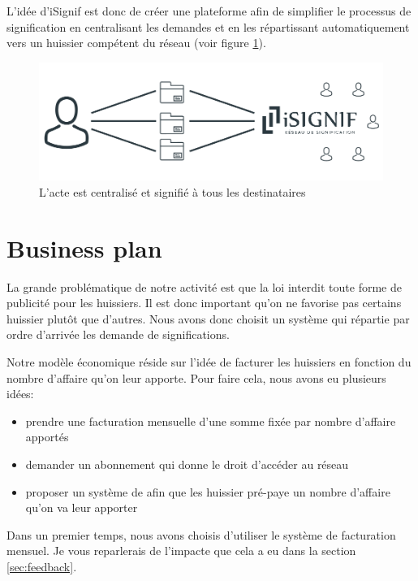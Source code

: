\documentclass[]{report}
\begin{document}
    L'idée d'iSignif est donc de créer une plateforme afin de simplifier le processus de signification en centralisant les demandes et en les répartissant automatiquement vers un huissier compétent du réseau  (voir figure \ref{fig:signification_after}).

    \begin{figure}
      \includegraphics[width=\linewidth]{img/signification_after.png}
      \caption{L'acte est centralisé et signifié à tous les destinataires}
      \label{fig:signification_after}
    \end{figure}

  \section{Business plan}

    La grande problématique de notre activité est que la loi interdit toute forme de publicité pour les huissiers. Il est donc important qu'on ne favorise pas certains huissier plutôt que d'autres. Nous avons donc choisit un système qui répartie par ordre d'arrivée les demande de significations.

    Notre modèle économique réside sur l'idée de facturer les huissiers en fonction du nombre d'affaire qu'on leur apporte. Pour faire cela, nous avons eu plusieurs idées:

    \begin{itemize}
      \item prendre une facturation mensuelle d'une somme fixée par nombre d'affaire apportés
      \item demander un abonnement qui donne le droit d'accéder au réseau
      \item proposer un système de  afin que les huissier pré-paye un nombre d'affaire qu'on va leur apporter
    \end{itemize}

    Dans un premier temps, nous avons choisis d'utiliser le système de facturation mensuel. Je vous reparlerais de l'impacte que cela a eu dans la section \ref{sec:feedback}.
\end{document}
